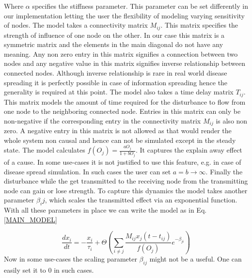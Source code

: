 \documentclass[11pt]{article}
\begin{document}
 Where $\alpha$ specifies the stiffness parameter. This parameter can be set differently in our implementation letting the user the flexibility of modeling varying sensitivity of nodes. The model takes a connectivity matrix $M_{ij}$. This matrix specifies the strength of influence of one node on the other. In our case this matrix is a symmetric matrix and the elements in the main diagonal do not have any meaning. Any non zero entry in this matrix signifies a connection between two nodes and any negative value in this matrix signifies inverse relationship between connected nodes. Although inverse relationship is rare in real world disease spreading it is perfectly possible in case of information spreading hence the generality is required at this point. The model also takes a time delay matrix $T_{ij}$. This matrix models the amount of time required for the disturbance to flow from one node to the neighboring connected node. Entries in this matrix can only be non-negative if the corresponding entry in the connectivity matrix $M_{ij}$ is also non zero. A negative entry in this matrix is not allowed as that would render the whole system non causal and hence can not be simulated except in the steady state. The model calculates $f(O_j) = \frac{aO_j}{1+bO_j}$. It captures the explain away effect of a cause. In some use-cases it is not justified to use this feature, e.g. in case of disease spread simulation. In such cases the user can set $a=b\rightarrow\infty$. Finally the disturbance while the get transmitted to the receiving node from the transmitting node can gain or lose strength. To capture this dynamics the model takes another parameter $\beta_ij$, which scales the transmitted effect via an exponential function. With all these parameters in place we can write the model as in Eq.\ref{MAIN_MODEL}

\begin{equation}
\frac{dx_i}{dt} = -\frac{x_i}{\tau_i}+\Theta\left(\sum_{i\ne j}{\frac{M_{ij}x_j(t-t_{ij})}{f(O_j)}e^{-\beta_{ji}}}\right) 
\label{MAIN_MODEL}
\end{equation}
Now in some use-cases the scaling parameter $\beta_{ij}$ might not be a useful. One can easily set it to $0$ in such cases.
\end{document}
